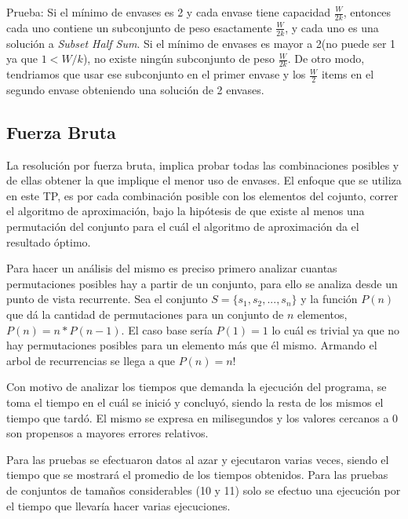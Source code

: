 \documentclass[12pt]{article}
\begin{document}
		Prueba: Si el mínimo de envases es 2 y cada envase tiene capacidad $\frac{W}{2k}$,
		 entonces cada uno contiene un subconjunto de peso esactamente $\frac{W}{2k}$, y
		 cada uno es una solución a \emph{Subset Half Sum}. Si el mínimo de envases
		 es mayor a 2(no puede ser 1 ya que $1<W/k$), no existe ningún subconjunto de peso $\frac{W}{2k}$. De 
		 otro modo, tendriamos que usar ese subconjunto en el primer envase y los
		 $\frac{W}{2}$ items en el segundo envase obteniendo una solución de 2 envases.
	
	\subsection{Fuerza Bruta}
		La resolución por fuerza bruta, implica probar todas las combinaciones 
		posibles y de ellas obtener la que implique el menor uso de envases.
		El enfoque que se utiliza en este TP, es por cada combinación posible
		con los elementos del cojunto, correr el algoritmo de aproximación, 
		bajo la hipótesis de que existe al menos una permutación del conjunto
		para el cuál el algoritmo de aproximación da el resultado óptimo.
		
		Para hacer un análisis del mismo es preciso primero analizar cuantas
		permutaciones posibles hay a partir de un conjunto, para ello
		se analiza desde un punto de vista recurrente. Sea el conjunto 
		$S=\{s_{1},s_{2},...,s_{n}\}$ y la función $P(n)$ que dá la cantidad
		de permutaciones para un conjunto de $n$ elementos, $P(n)=n*P(n-1)$.
		El caso base sería $P(1)=1$ lo cuál es trivial ya que no hay permutaciones
		posibles para un elemento más que él mismo. Armando el arbol de 
		recurrencias se llega a que $P(n)=n!$
	
		Con motivo de analizar los tiempos que demanda la ejecución del programa,
		se toma el tiempo en el cuál se inició y concluyó, siendo la resta
		de los mismos el tiempo que tardó. El mismo se expresa en milisegundos y
		los valores cercanos a 0 son propensos a mayores errores relativos.
		
		Para las pruebas se efectuaron datos al azar y ejecutaron varias veces,
		siendo el tiempo que se mostrará el promedio de los tiempos obtenidos.
		Para las pruebas de conjuntos de tamaños considerables (10 y 11) solo
		se efectuo una ejecución por el tiempo que llevaría hacer varias
		ejecuciones.
		
\end{document}
